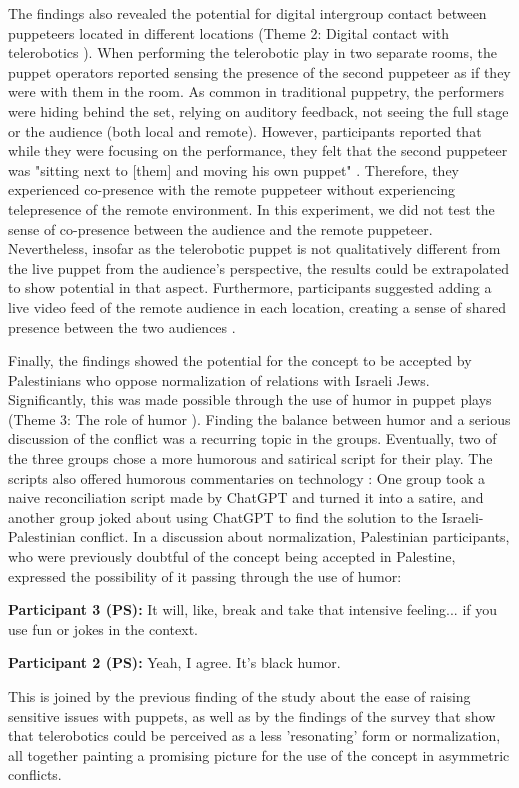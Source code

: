 \documentclass[dissertation,math,vertlayout,pdfa,colorlinks]{aaltoseries}
\begin{document}
The findings also revealed the potential for digital intergroup contact between puppeteers located in different locations (Theme 2: Digital contact with telerobotics \cite[p. 16]{peledTeleroboticTheaterOppressed2025}). When performing the telerobotic play in two separate rooms, the puppet operators reported sensing the presence of the second puppeteer as if they were with them in the room. As common in traditional puppetry, the performers were hiding behind the set, relying on auditory feedback, not seeing the full stage or the audience (both local and remote). However, participants reported that while they were focusing on the performance, they felt that the second puppeteer was "sitting next to [them] and moving his own puppet" \cite[p. 16]{peledTeleroboticTheaterOppressed2025}. Therefore, they experienced co-presence with the remote puppeteer without experiencing telepresence of the remote environment. In this experiment, we did not test the sense of co-presence between the audience and the remote puppeteer. Nevertheless, insofar as the telerobotic puppet is not qualitatively different from the live puppet from the audience's perspective, the results could be extrapolated to show potential in that aspect. Furthermore, participants suggested adding a live video feed of the remote audience in each location, creating a sense of shared presence between the two audiences \cite[p. 16]{peledTeleroboticTheaterOppressed2025}.

Finally, the findings showed the potential for the concept to be accepted by Palestinians who oppose normalization of relations with Israeli Jews. Significantly, this was made possible through the use of humor in puppet plays (Theme 3: The role of humor \cite[p. 17]{peledTeleroboticTheaterOppressed2025}). Finding the balance between humor and a serious discussion of the conflict was a recurring topic in the groups. Eventually, two of the three groups chose a more humorous and satirical script for their play. The scripts also offered humorous commentaries on technology \cite[p. 12]{peledTeleroboticTheaterOppressed2025}: One group took a naive reconciliation script made by ChatGPT and turned it into a satire, and another group joked about using ChatGPT to find the solution to the Israeli-Palestinian conflict. In a discussion about normalization, Palestinian participants, who were previously doubtful of the concept being accepted in Palestine, expressed the possibility of it passing through the use of humor:
\begin{displayquote}
\textbf{Participant 3 (PS):} It will, like, break and take that intensive feeling... if you use fun or jokes in the context. 

\textbf{Participant 2 (PS):} Yeah, I agree. It's black humor.
\end{displayquote}
This is joined by the previous finding of the study about the ease of raising sensitive issues with puppets, as well as by the findings of the survey that show that telerobotics could be perceived as a less 'resonating' form or normalization, all together painting a promising picture for the use of the concept in asymmetric conflicts.
\end{document}
